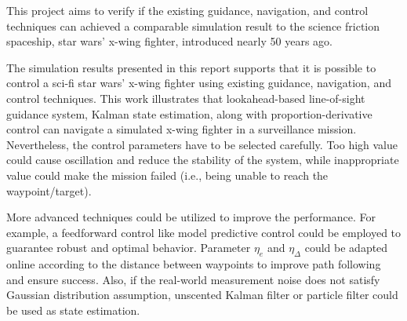 This project aims to verify if the existing guidance, navigation, and control techniques can achieved a comparable simulation result to the science friction spaceship, star wars' x-wing fighter, introduced nearly 50 years ago. 

The simulation results presented in this report supports that it is possible to control a sci-fi star wars' x-wing fighter using existing guidance, navigation, and control techniques. This work illustrates that lookahead-based line-of-sight guidance system, Kalman state estimation, along with proportion-derivative control can navigate a simulated x-wing fighter in a surveillance mission. Nevertheless, the control parameters have to be selected carefully. Too high value could cause oscillation and reduce the stability of the system, while inappropriate value could make the mission failed (i.e., being unable to reach the waypoint/target).

More advanced techniques could be utilized to improve the performance. For example, a feedforward control like model predictive control \cite{mpc_drone} could be employed to guarantee robust and optimal behavior. Parameter $\eta_e$ and $\eta_\Delta$ could be adapted online according to the distance between waypoints to improve path following and ensure success. Also, if the real-world measurement noise does not satisfy Gaussian distribution assumption, unscented Kalman filter or particle filter could be used as state estimation.


